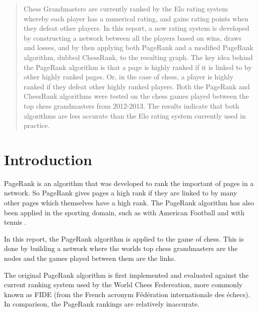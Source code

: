 \documentclass[pdftex,11pt,a4paper]{report}
\begin{document}
\thispagestyle{empty}
\newpage
{}

\newpage
\tableofcontents
\newpage
{}

\pagebreak

\begin{abstract}

Chess Grandmasters are currently ranked by the Elo rating system whereby
each player has a numerical rating, and gains rating points when they defeat
other players. In this report, a new rating system is developed by constructing
a network between all the players based on wins, draws and losses, and by then
applying both PageRank and a modified PageRank algorithm, dubbed ChessRank,
         to the resulting graph. The key idea
behind the PageRank algorithm is that a page is highly ranked if it is
linked to by other highly ranked pages. Or, in the case of chess, a player
is highly ranked if they defeat other highly ranked players. Both the PageRank and ChessRank
algorithms were tested on the chess games played between the top
chess grandmasters from 2012-2013. The results indicate that both algorithms
are less accurate than the Elo rating
system currently used in practice.

\end{abstract}

\pagebreak



\chapter{Introduction}

PageRank is an algorithm that was developed to rank the important of pages in a network. 
So PageRank gives pages a high rank if they are linked to by many other pages which themselves
have a high rank. The PageRank algorithm has also been applied in the sporting domain, such as with
American Football\cite{football} and with tennis \cite{tennis}.

In this report, the PageRank algorithm is applied to the game of chess. This is done
by building a network where the worlds top
chess grandmasters are the nodes and the games played between them are the links.

The original PageRank algorithm is first implemented and evaluated
against the current ranking system used by the World Chess Federeation, more commonly
known as FIDE (from the French acronym Fédération internationale des échecs).
In comparison, the PageRank rankings are relatively inaccurate.
\end{document}
